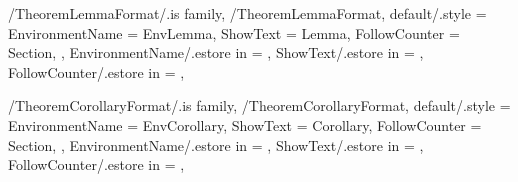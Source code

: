 \newcommand{\InsertExample}[2][\empty]
{%
  \InsertTheoremContent[#1]{\GetTheoremExampleFormatEnvironmentName}{#2}%
} %

\newcommand{\InitTheoremExampleFormat}
{%
  \theoremstyle{definition}%
  \ifthenelse{\equal{\GetTheoremExampleFormatFollowCounter}{\empty}}%
  {%
    \newtheorem{%
      \GetTheoremExampleFormatEnvironmentName}{%
      \GetTheoremExampleFormatShowText}%
  }%
  {%
    \MappingTheoremCounter[Example]{\GetTheoremExampleFormatFollowCounter}%
    \newtheorem{%
      \GetTheoremExampleFormatEnvironmentName}{%
      \GetTheoremExampleFormatShowText}[%
      \GetTheoremExampleFormatFollowCounter]%
  }%
} %


\pgfkeys
{
  /TheoremLemmaFormat/.is family, /TheoremLemmaFormat,
  default/.style =
  {
    EnvironmentName = {EnvLemma},
    ShowText = {Lemma},
    FollowCounter = Section,
  },
  EnvironmentName/.estore in = \GetTheoremLemmaFormatEnvironmentName,
  ShowText/.estore in = \GetTheoremLemmaFormatShowText,
  FollowCounter/.estore in = \GetTheoremLemmaFormatFollowCounter,
} %

\newcommand{\InsertLemma}[2][\empty]
{%
  \InsertTheoremContent[#1]{\GetTheoremLemmaFormatEnvironmentName}{#2}%
} %

\newcommand{\InitTheoremLemmaFormat}
{%
  \theoremstyle{plain}%
  \ifthenelse{\equal{\GetTheoremLemmaFormatFollowCounter}{\empty}}%
  {%
    \newtheorem{%
      \GetTheoremLemmaFormatEnvironmentName}{%
      \GetTheoremLemmaFormatShowText}%
  }%
  {%
    \MappingTheoremCounter[Lemma]{\GetTheoremLemmaFormatFollowCounter}%
    \newtheorem{%
      \GetTheoremLemmaFormatEnvironmentName}{%
      \GetTheoremLemmaFormatShowText}[%
      \GetTheoremLemmaFormatFollowCounter]%
  }%
} %


\pgfkeys
{
  /TheoremCorollaryFormat/.is family, /TheoremCorollaryFormat,
  default/.style =
  {
    EnvironmentName = {EnvCorollary},
    ShowText = {Corollary},
    FollowCounter = Section,
  },
  EnvironmentName/.estore in = \GetTheoremCorollaryFormatEnvironmentName,
  ShowText/.estore in = \GetTheoremCorollaryFormatShowText,
  FollowCounter/.estore in = \GetTheoremCorollaryFormatFollowCounter,
} %

\newcommand{\InsertCorollary}[2][\empty]
{%
  \InsertTheoremContent[#1]{\GetTheoremCorollaryFormatEnvironmentName}{#2}%
} %

